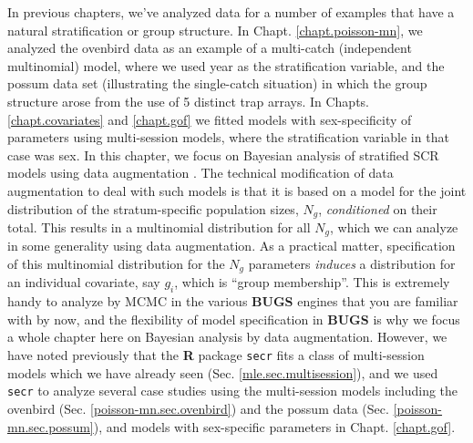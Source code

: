 In previous chapters, we've analyzed data for a number of examples
that have a natural stratification or group structure. In
Chapt. \ref{chapt.poisson-mn}, we analyzed the ovenbird data as an
example of a multi-catch (independent multinomial) model, where we
used year as the stratification variable, and the possum data set
(illustrating the single-catch situation) in which the group structure
arose from the use of 5 distinct trap arrays.  In
Chapts. \ref{chapt.covariates} and \ref{chapt.gof} we fitted models
with sex-specificity of parameters using multi-session models, where
the stratification variable in that case was sex.  In this chapter, we
focus on Bayesian analysis of stratified SCR models using data
augmentation \citep{converse_royle:2012,royle_etal:2012arXiv}.  The
technical modification of data augmentation to deal with such models
is that it is based on a model for the joint distribution of the
stratum-specific population sizes, $N_{g}$, {\it conditioned} on their
total. This results in a multinomial distribution for all $N_{g}$,
which we can analyze in some generality using data augmentation.  As a
practical matter, specification of this multinomial distribution for
the $N_{g}$ parameters {\it induces} a distribution for an individual
covariate, say $g_{i}$, which is ``group membership''.  This is
extremely handy to analyze by MCMC in the various {\bf BUGS} engines
that you are familiar with by now, and the flexibility of model
specification in {\bf BUGS} is why we focus a whole chapter here on
Bayesian analysis by data augmentation.  However, we have noted
previously that the {\bf R} package \mbox{\tt secr} fits a class of
multi-session models which we have already seen
(Sec. \ref{mle.sec.multisession}), and we used \mbox{\tt secr} to
analyze several case studies using the multi-session models including
the ovenbird (Sec. \ref{poisson-mn.sec.ovenbird}) and the possum data
(Sec. \ref{poisson-mn.sec.possum}), and models with sex-specific
parameters in Chapt. \ref{chapt.gof}.

